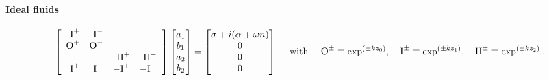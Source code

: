 \documentclass[prfluids]{revtex4-2}
\newcommand{\zeroplu}{\text{O}^+}
\newcommand{\zeromin}{\text{O}^-}
\newcommand{\oneplus}{\text{I}^+}
\newcommand{\onemins}{\text{I}^-}
\newcommand{\twoplus}{\text{II}^+}
\newcommand{\twomins}{\text{II}^-}
\begin{document}
\paragraph{Ideal fluids}
\begin{footnotesize}\begin{eqnarray}
  \left[\begin{array}{r r r r}
    \oneplus & \onemins  &                        \\    
    \zeroplu & \zeromin  &                        \\    
             &           &  \twoplus &  \twomins  \\
    \oneplus & \onemins  & -\oneplus & -\onemins
  \end{array}\right]
  \left[\begin{matrix}
    a_1 \\ b_1 \\ a_2 \\ b_2
  \end{matrix}\right]
  =
  \left[\begin{matrix}
    \sigma + i(\alpha + \omega n) \\ 0 \\ 0 \\ 0
  \end{matrix}\right]
  \quad\text{ with }\quad
  \text{O}^\pm \equiv \exp^{(\pm kz_0)}, \quad
  \text{I}^\pm \equiv \exp^{(\pm kz_1)}, \quad
  \text{II}^\pm \equiv \exp^{(\pm kz_2)}.
\end{eqnarray}\end{footnotesize}




\end{document}
